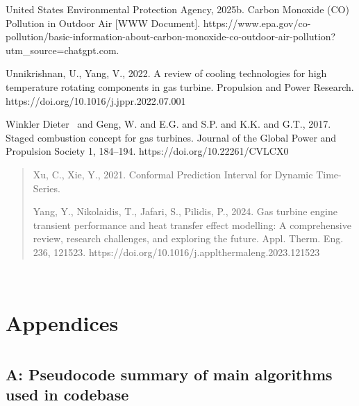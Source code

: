 \documentclass[11pt]{article}
\begin{document}
United States Environmental Protection Agency, 2025b. Carbon Monoxide
(CO) Pollution in Outdoor Air {[}WWW Document{]}.
https://www.epa.gov/co-pollution/basic-information-about-carbon-monoxide-co-outdoor-air-pollution?utm\_source=chatgpt.com.

Unnikrishnan, U., Yang, V., 2022. A review of cooling technologies for
high temperature rotating components in gas turbine. Propulsion and
Power Research. https://doi.org/10.1016/j.jppr.2022.07.001

Winkler Dieter~ and Geng, W. and E.G. and S.P. and K.K. and G.T., 2017.
Staged combustion concept for gas turbines. Journal of the Global Power
and Propulsion Society 1, 184--194. https://doi.org/10.22261/CVLCX0

\begin{quote}
Xu, C., Xie, Y., 2021. Conformal Prediction Interval for Dynamic
Time-Series.

Yang, Y., Nikolaidis, T., Jafari, S., Pilidis, P., 2024. Gas turbine
engine transient performance and heat transfer effect modelling: A
comprehensive review, research challenges, and exploring the future.
Appl. Therm. Eng. 236, 121523.
https://doi.org/10.1016/j.applthermaleng.2023.121523
\end{quote}

~

\section{}\label{section-17}

\section{Appendices}\label{appendices}

\section{}\label{section-18}

\subsection{A: Pseudocode summary of main algorithms used in
codebase}\label{a-pseudocode-summary-of-main-algorithms-used-in-codebase}

\section{}\label{section-19}
\end{document}
